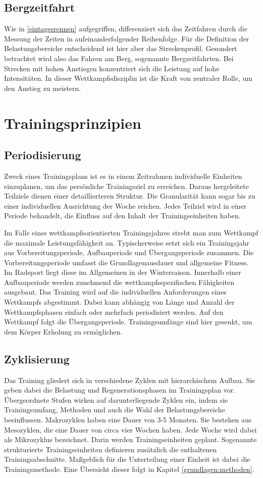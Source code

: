 \subsection{Bergzeitfahrt}
Wie in \ref{eintagesrennen} aufgegriffen, differenziert sich das Zeitfahren durch die Messung der Zeiten in aufeinanderfolgender Reihenfolge. Für die Definition der Belastungsbereiche entscheidend ist hier aber das Streckenprofil. Gesondert betrachtet wird also das Fahren am Berg, sogenannte Bergzeitfahrten. Bei Strecken mit hohen Anstiegen konzentriert sich die Leistung auf hohe Intensitäten. In dieser Wettkampfsdisziplin ist die Kraft von zentraler Rolle, um den Anstieg zu meistern.

\section{Trainingsprinzipien}
\subsection{Periodisierung}
Zweck eines Trainingsplans ist es in einem Zeitrahmen individuelle Einheiten einzuplanen, um das persönliche Trainingsziel zu erreichen. Daraus hergeleitete Teilziele dienen einer detaillierteren Struktur. Die Granularität kann sogar bis zu einer individuellen Ausrichtung der Woche reichen. Jedes Teilziel wird in einer Periode behandelt, die Einfluss auf den Inhalt der Trainingseinheiten haben.\cite{periodization} \par
Im Falle eines wettkampfsorientierten Trainingsjahres strebt man zum Wettkampf die maximale Leistungsfähigkeit an. Typischerweise setzt sich ein Trainingsjahr aus Vorbereitungsperiode, Aufbauperiode und Übergangsperiode zusammen.\cite[279]{Trainingswissenschaft} Die Vorbereitungsperiode umfasst die Grundlagenausdauer und allgemeine Fitness. Im Radsport liegt diese im Allgemeinen in der Wintersaison. Innerhalb einer Aufbauperiode werden zunehmend die wettkampfsspezifischen Fähigkeiten ausgebaut. Das Training wird auf die individuellen Anforderungen eines Wettkampfs abgestimmt. Dabei kann abhängig von Länge und Anzahl der Wettkampfsphasen einfach oder mehrfach periodisiert werden. Auf den Wettkampf folgt die Übergangsperiode. Trainingsumfänge sind hier gesenkt, um dem Körper Erholung zu ermöglichen.
\subsection{Zyklisierung}
Das Training gliedert sich in verschiedene Zyklen mit hierarchischem Aufbau. Sie geben dabei die Belastung und Regenerationsphasen im Trainingsplan vor. Übergeordnete Stufen wirken auf darunterliegende Zyklen ein, indem sie Trainingsumfang, Methoden und auch die Wahl der Belastungsbereiche beeinflussen. \cite[283]{Trainingswissenschaft}
Makrozyklen haben eine Dauer von 3-5 Monaten. Sie bestehen aus Mesozyklen, die eine Dauer von circa vier Wochen haben. Jede Woche wird dabei als Mikrozyklus bezeichnet. Darin werden Trainingseinheiten geplant. Sogenannte strukturierte Trainingseinheiten definieren zusätzlich die enthaltenen Trainingsabschnitte. Maßgeblich für die Unterteilung einer Einheit ist dabei die Trainingsmethode. Eine Übersicht dieser folgt in Kapitel \ref{grundlagen:methoden}.

